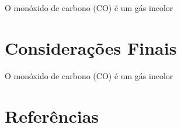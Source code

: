 \documentclass[12pt]{beamer}
\begin{document}
    \begin{frame}
        O monóxido de carbono (CO) é um gás incolor 
    \end{frame}

    \section{Considerações Finais}

    \begin{frame}
        O monóxido de carbono (CO) é um gás incolor 
    \end{frame}

    \section{Referências}
    
    \printbibliography
\end{document}
